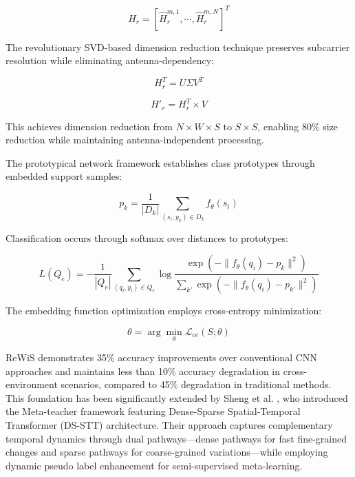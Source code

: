 \documentclass[journal]{IEEEtran}
\begin{document}
\begin{equation}
H_r = [\hat{H}^{m,1}_r, \cdots, \hat{H}^{m,N}_r]^T
\label{eq:rewis_integration}
\end{equation}

The revolutionary SVD-based dimension reduction technique preserves subcarrier resolution while eliminating antenna-dependency:

\begin{equation}
H_r^T = U\Sigma V^T
\label{eq:rewis_svd}
\end{equation}

\begin{equation}
H'_r = H_r^T \times V
\label{eq:rewis_compact}
\end{equation}

This achieves dimension reduction from $N \times W \times S$ to $S \times S$, enabling 80\% size reduction while maintaining antenna-independent processing.

The prototypical network framework establishes class prototypes through embedded support samples:

\begin{equation}
p_k = \frac{1}{|D_k|} \sum_{(s_i,y_k) \in D_k} f_\theta(s_i)
\label{eq:rewis_prototype}
\end{equation}

Classification occurs through softmax over distances to prototypes:

\begin{equation}
L(Q_e) = -\frac{1}{|Q_e|} \sum_{(q_i,y_i) \in Q_e} \log \frac{\exp(-\|f_\theta(q_i) - p_k\|^2)}{\sum_{k'} \exp(-\|f_\theta(q_i) - p_{k'}\|^2)}
\label{eq:rewis_loss}
\end{equation}

The embedding function optimization employs cross-entropy minimization:

\begin{equation}
\theta = \arg\min_\theta \mathcal{L}_{ce}(S; \theta)
\label{eq:rewis_embedding}
\end{equation}

ReWiS demonstrates 35\% accuracy improvements over conventional CNN approaches and maintains less than 10\% accuracy degradation in cross-environment scenarios, compared to 45\% degradation in traditional methods. This foundation has been significantly extended by Sheng et al. \cite{sheng2024metaformer}, who introduced the Meta-teacher framework featuring Dense-Sparse Spatial-Temporal Transformer (DS-STT) architecture. Their approach captures complementary temporal dynamics through dual pathways—dense pathways for fast fine-grained changes and sparse pathways for coarse-grained variations—while employing dynamic pseudo label enhancement for semi-supervised meta-learning.
\end{document}
